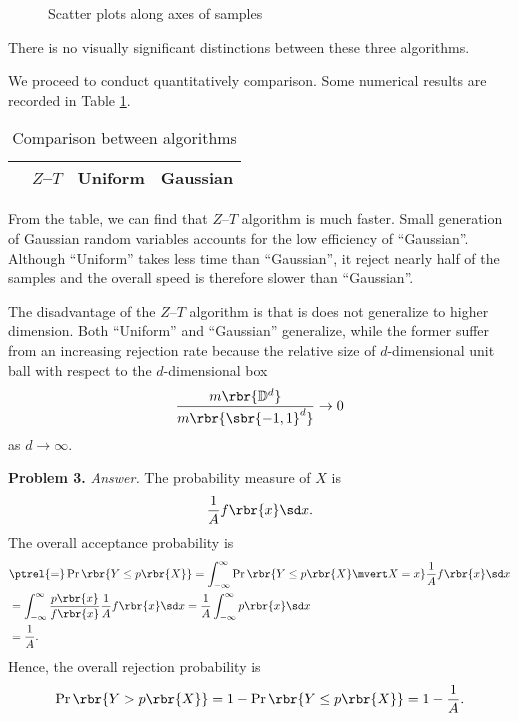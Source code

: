 \documentclass[english, nochinese]{pnote}
\DeclareMathOperator\oppr{\mathrm{Pr}}
\begin{document}
\begin{figure}[htb]
\centering
\scalebox{0.7}{}
\scalebox{0.7}{}
\caption{Scatter plots along axes of samples}
\label{Fig:2D}
\end{figure}

There is no visually significant distinctions between these three algorithms.

We proceed to conduct quantitatively comparison. Some numerical results are recorded in Table \ref{Tbl:Res}.

\begin{table}[htb]
\centering
\begin{tabular}{|c|c|c|c|}
\hline
& $Z$--$T$ & Uniform & Gaussian \\
\hline

\end{tabular}
\caption{Comparison between algorithms}
\label{Tbl:Res}
\end{table}

From the table, we can find that $Z$--$T$ algorithm is much faster. Small generation of Gaussian random variables accounts for the low efficiency of ``Gaussian''. Although ``Uniform'' takes less time than ``Gaussian'', it reject nearly half of the samples and the overall speed is therefore slower than ``Gaussian''.

The disadvantage of the $Z$--$T$ algorithm is that is does not generalize to higher dimension. Both ``Uniform'' and ``Gaussian'' generalize, while the former suffer from an increasing rejection rate because the relative size of $d$-dimensional unit ball with respect to the $d$-dimensional box
\begin{equation}
\frac{ m \rbr{\mathbb{D}^d} }{ m \rbr{\sbr{ -1, 1 }^d} } \rightarrow 0 
\end{equation}
as $ d \rightarrow \infty $.

\textbf{Problem 3.} \textit{Answer.} The probability measure of $X$ is
\begin{equation}
\frac{1}{A} f \rbr{x} \sd x.
\end{equation}
The overall acceptance probability is
\begin{equation}
\begin{split}
&\ptrel{=} \oppr \rbr{ Y \le p \rbr{X} } = \int_{-\infty}^{\infty} \oppr \rbr{ Y \le p \rbr{X} \mvert X = x } \frac{1}{A} f \rbr{x} \sd x \\
&= \int_{-\infty}^{\infty} \frac{ p \rbr{x} }{ f \rbr{x} } \frac{1}{A} f \rbr{x} \sd x = \frac{1}{A} \int_{-\infty}^{\infty} p \rbr{x} \sd x \\
&= \frac{1}{A}.
\end{split}
\end{equation}
Hence, the overall rejection probability is
\begin{equation}
\oppr \rbr{ Y > p \rbr{X} } = 1 - \oppr \rbr{ Y \le p \rbr{X} } = 1 - \frac{1}{A}.
\end{equation}
\end{document}
